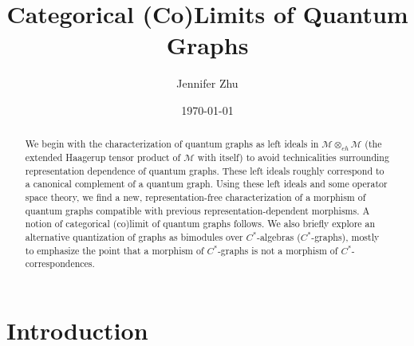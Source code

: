 \documentclass[12pt]{article}
\theoremstyle{definition}
\newcommand{\<}{\langle}
\renewcommand{\>}{\rangle}
\begin{document}
\title{Categorical (Co)Limits of Quantum Graphs}
\author{Jennifer Zhu}
\date{\today}

\maketitle

\begin{abstract}
    We begin with the characterization of quantum graphs as left ideals in $\mathcal M \otimes_{eh} \mathcal M$ (the extended Haagerup tensor product of $\mathcal M$ with itself) to avoid technicalities surrounding representation dependence of quantum graphs. These left ideals roughly correspond to a canonical complement of a quantum graph. Using these left ideals and some operator space theory, we find a new, representation-free characterization of a morphism of quantum graphs compatible with previous representation-dependent morphisms. A notion of categorical (co)limit of quantum graphs follows. We also briefly explore an alternative quantization of graphs as bimodules over $C^*$-algebras ($C^*$-graphs), mostly to emphasize the point that a morphism of $C^*$-graphs is not a morphism of $C^*$-correspondences.
\end{abstract}

\tableofcontents

\section{Introduction}
\end{document}
